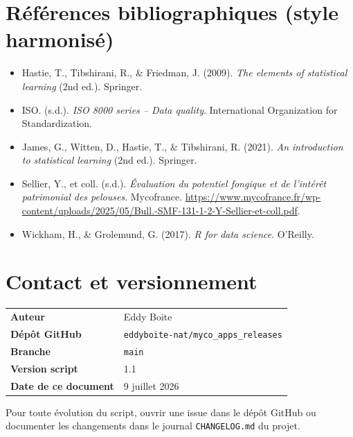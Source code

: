 \documentclass[11pt,a4paper]{article}
\begin{document}
\section{R\'ef\'erences bibliographiques (style harmonis\'e)}
\begin{itemize}[leftmargin=1.2cm]
  \item Hastie, T., Tibshirani, R., \& Friedman, J. (2009). \textit{The elements of statistical learning} (2nd ed.). Springer.
  \item ISO. (s.d.). \textit{ISO 8000 series -- Data quality}. International Organization for Standardization.
  \item James, G., Witten, D., Hastie, T., \& Tibshirani, R. (2021). \textit{An introduction to statistical learning} (2nd ed.). Springer.
  \item Sellier, Y., et coll. (s.d.). \textit{Évaluation du potentiel fongique et de l'int\'erêt patrimonial des pelouses}. Mycofrance. \url{https://www.mycofrance.fr/wp-content/uploads/2025/05/Bull.-SMF-131-1-2-Y-Sellier-et-coll.pdf}.
  \item Wickham, H., \& Grolemund, G. (2017). \textit{R for data science}. O'Reilly.
\end{itemize}
\section*{Contact et versionnement}

\begin{table}[htbp]
  \centering
  \begin{tabular}{ll}
    \toprule
    \textbf{Auteur}          & Eddy Boite \\
    \textbf{D\'epôt GitHub}    & \texttt{eddyboite-nat/myco\_apps\_releases} \\
    \textbf{Branche}         & \texttt{main} \\
    \textbf{Version script}  & 1.1 \\
    \textbf{Date de ce document} & 9 juillet 2026 \\
    \bottomrule
  \end{tabular}
\end{table}

Pour toute \'evolution du script, ouvrir une issue dans le d\'epôt GitHub
ou documenter les changements dans le journal \texttt{CHANGELOG.md} du projet.

\end{document}

